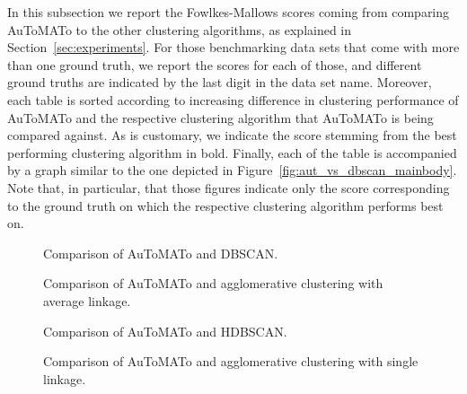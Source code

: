 \documentclass[10pt]{article} %
\theoremstyle{plain}
\newcommand{\aut}{AuToMATo\xspace}
\begin{document}
In this subsection we report the Fowlkes-Mallows scores coming from comparing \aut to the other clustering algorithms, as explained in Section~\ref{sec:experiments}. For those benchmarking data sets that come with more than one ground truth, we report the scores for each of those, and different ground truths are indicated by the last digit in the data set name. Moreover, each table is sorted according to increasing difference in clustering performance of \aut and the respective clustering algorithm that \aut is being compared against. As is customary, we indicate the score stemming from the best performing clustering algorithm in bold.
Finally, each of the table is accompanied by a graph similar to the one depicted in Figure~\ref{fig:aut_vs_dbscan_mainbody}. Note that, in particular, that those figures indicate only the score corresponding to the ground truth on which the respective clustering algorithm performs best on.



\begin{figure}[ht]
    \centering
    
    \caption{Comparison of \aut and DBSCAN.}
    \label{fig:aut_vs_dbscan}
\end{figure}



\begin{figure}[ht]
    \centering
    
    \caption{Comparison of \aut and agglomerative clustering with average linkage.}
    \label{fig:aut_vs_linkage_average}
\end{figure}



\begin{figure}[ht]
    \centering
    
    \caption{Comparison of \aut and HDBSCAN.}
    \label{fig:aut_vs_hdbscan}
\end{figure}



\begin{figure}[ht]
    \centering
    
    \caption{Comparison of \aut and agglomerative clustering with single linkage.}
    \label{fig:aut_vs_linkage_single}
\end{figure}
\end{document}
